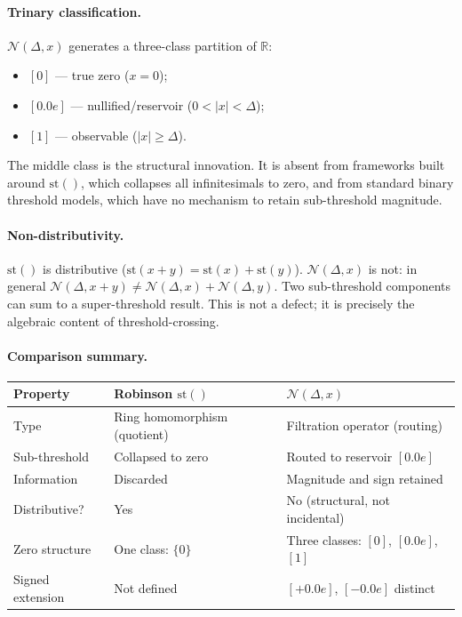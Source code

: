 \documentclass[12pt, a4paper]{article}
\theoremstyle{plain}
\theoremstyle{definition}
\newcommand{\N}{\mathcal{N}}
\newcommand{\R}{\mathbb{R}}
\begin{document}
\paragraph{Trinary classification.}
$\N(\Delta, x)$ generates a three-class partition of $\R$:
\begin{itemize}[noitemsep]
  \item $[0]$ --- true zero ($x = 0$);
  \item $[0.0e]$ --- nullified/reservoir ($0 < |x| < \Delta$);
  \item $[1]$ --- observable ($|x| \geq \Delta$).
\end{itemize}
The middle class is the structural innovation.
It is absent from frameworks built around $\mathrm{st}()$, which
collapses all infinitesimals to zero, and from standard binary threshold
models, which have no mechanism to retain sub-threshold magnitude.

\paragraph{Non-distributivity.}
$\mathrm{st}()$ is distributive ($\mathrm{st}(x+y) = \mathrm{st}(x) +
\mathrm{st}(y)$).
$\N(\Delta, x)$ is not: in general
$\N(\Delta, x + y) \neq \N(\Delta, x) + \N(\Delta, y)$.
Two sub-threshold components can sum to a super-threshold result.
This is not a defect; it is precisely the algebraic content of
threshold-crossing.

\paragraph{Comparison summary.}
\begin{center}
\renewcommand{\arraystretch}{1.3}
\begin{tabular}{lll}
  \toprule
  \textbf{Property} & \textbf{Robinson $\mathrm{st}()$} & \textbf{$\N(\Delta, x)$} \\
  \midrule
  Type              & Ring homomorphism (quotient)   & Filtration operator (routing) \\
  Sub-threshold     & Collapsed to zero       & Routed to reservoir $[0.0e]$ \\
  Information       & Discarded               & Magnitude and sign retained \\
  Distributive?     & Yes                     & No (structural, not incidental) \\
  Zero structure    & One class: $\{0\}$      & Three classes: $[0]$, $[0.0e]$, $[1]$ \\
  Signed extension  & Not defined             & $[{+}0.0e]$, $[{-}0.0e]$ distinct \\
  \bottomrule
\end{tabular}
\end{center}
\end{document}
